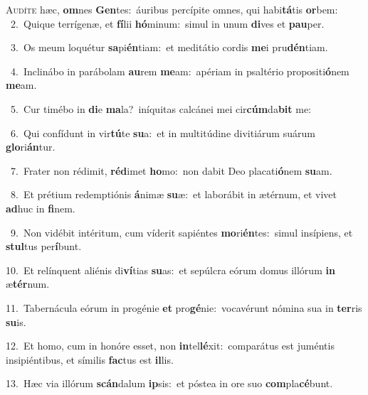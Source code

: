 \lettrine{\initial\textcolor{\initialcolor}{A}}{udíte} hæc, \textbf{om}\-nes \textbf{Gen}\-tes:~\star áuribus percípite omnes, qui habi\-\textbf{tá}\-tis \textbf{or}\-bem:\\
{\numbfont\textcolor{\numbcolor}{~2.}}~Quique terrígenæ, et \textbf{fí}\-lii \textbf{hó}\-minum:~\star simul in unum \textbf{di}\-ves et \textbf{pau}\-per.\par
{\numbfont\textcolor{\numbcolor}{~3.}}~Os meum loquétur \textbf{sa}\-pi\-\textbf{én}\-tiam:~\star et meditátio cordis \textbf{me}\-i pru\-\textbf{dén}\-tiam.\par
{\numbfont\textcolor{\numbcolor}{~4.}}~Inclinábo in parábolam \textbf{au}\-rem \textbf{me}\-am:~\star apériam in psaltério propositi\-\textbf{ó}\-nem \textbf{me}\-am.\par
{\numbfont\textcolor{\numbcolor}{~5.}}~Cur timébo in \textbf{di}\-e \textbf{ma}\-la?~\star iníquitas calcánei mei cir\-\textbf{cúm}\-da\textbf{bit} me:\par
{\numbfont\textcolor{\numbcolor}{~6.}}~Qui confídunt in vir\-\textbf{tú}\-te \textbf{su}\-a:~\star et in multitúdine divitiárum suárum \textbf{glo}\-ri\-\textbf{án}\-tur.\par
{\numbfont\textcolor{\numbcolor}{~7.}}~Frater non rédimit, \textbf{réd}\-imet \textbf{ho}\-mo:~\star non dabit Deo placati\-\textbf{ó}\-nem \textbf{su}\-am.\par
{\numbfont\textcolor{\numbcolor}{~8.}}~Et prétium redemptiónis \textbf{á}\-nimæ \textbf{su}\-æ:~\star et laborábit in ætérnum, et vivet \textbf{ad}\-huc in \textbf{fi}\-nem.\par
{\numbfont\textcolor{\numbcolor}{~9.}}~Non vidébit intéritum, cum víderit sapiéntes \textbf{mo}\-ri\-\textbf{én}\-tes:~\star simul insípiens, et \textbf{stul}\-tus per\-\textbf{í}\-bunt.\par
{\numbfont\textcolor{\numbcolor}{10.}}~Et relínquent aliénis di\-\textbf{ví}\-tias \textbf{su}\-as:~\star et sepúlcra eórum domus illórum \textbf{in} æ\-\textbf{tér}\-num.\par
{\numbfont\textcolor{\numbcolor}{11.}}~Tabernácula eórum in progénie \textbf{et} pro\-\textbf{gé}\-nie:~\star vocavérunt nómina sua in \textbf{ter}\-ris \textbf{su}\-is.\par
{\numbfont\textcolor{\numbcolor}{12.}}~Et homo, cum in honóre esset, non \textbf{in}\-tel\-\textbf{lé}\-xit:~\star comparátus est juméntis insipiéntibus, et símilis \textbf{fac}\-tus est \textbf{il}\-lis.\par
{\numbfont\textcolor{\numbcolor}{13.}}~Hæc via illórum \textbf{scán}\-dalum \textbf{ip}\-sis:~\star et póstea in ore suo \textbf{com}\-pla\-\textbf{cé}\-bunt.\par
